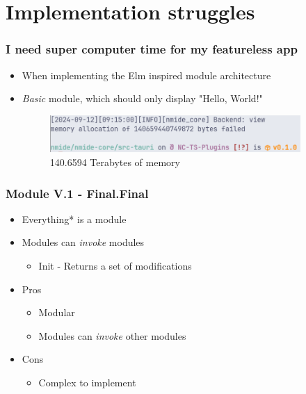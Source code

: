 \showlogo

\section{Implementation struggles}
\SectionPage

\begin{frame}
  \frametitle{I need super computer time for my featureless app}
  \begin{itemize}
    \item When implementing the Elm inspired module architecture
    \pause
    \item \textit{Basic} module, which should only display "Hello, World!"
    \pause
      \begin{figure}
        \centering
        \includegraphics[width=0.9\textwidth]{./pics/memory-allocation-zoomed.png}
        \caption{140.6594 Terabytes of memory}
      \end{figure}
  \end{itemize}
\end{frame}

\hidelogo

\showlogo
\begin{frame}
  \frametitle{Module V.1 - Final.Final}
  \begin{itemize}
    \item Everything* is a module
      \pause
    \item Modules can \textit{invoke} modules
      \pause
    \begin{itemize}
      \item Init - Returns a set of modifications
    \end{itemize}
    \pause
    \item Pros
    \pause
    \begin{itemize}
      \item Modular
        \pause
      \item Modules can \textit{invoke} other modules
    \end{itemize}
    \pause
    \item Cons
    \begin{itemize}
        \pause
      \item Complex to implement
    \end{itemize}
  \end{itemize}
\end{frame}

